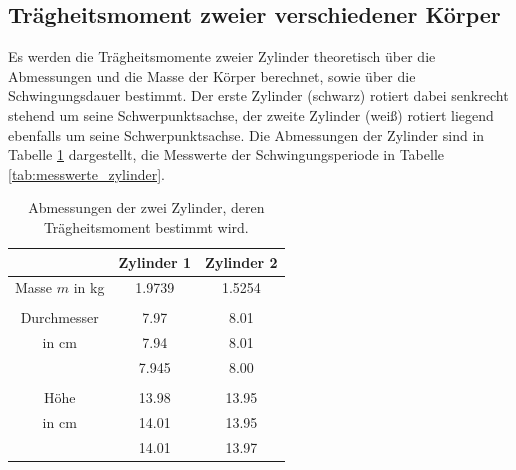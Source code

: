 \subsection{Trägheitsmoment zweier verschiedener Körper}
Es werden die Trägheitsmomente zweier Zylinder theoretisch über die Abmessungen
und die Masse der Körper berechnet, sowie über die Schwingungsdauer bestimmt.
Der erste Zylinder (schwarz) rotiert dabei senkrecht stehend um seine
Schwerpunktsachse, der zweite Zylinder (weiß) rotiert liegend ebenfalls um seine
Schwerpunktsachse.
Die Abmessungen der Zylinder sind in Tabelle \ref{tab:abmessungen_zylinder}
dargestellt, die Messwerte der Schwingungsperiode in Tabelle
\ref{tab:messwerte_zylinder}.
\begin{table}
  \centering
  \begin{tabular}{c| c c}
    \toprule
        & Zylinder 1 & Zylinder 2 \\
    \midrule
    Masse $m$ in \si{\kilo\gram} & 1.9739 & 1.5254 \\
    & & \\
    Durchmesser          & 7.97 & 8.01  \\
    in \si{\centi\meter} & 7.94 & 8.01  \\
                         & 7.945 & 8.00  \\
    & & \\
    Höhe                 & 13.98 & 13.95 \\
    in \si{\centi\meter} & 14.01 & 13.95 \\
                         & 14.01 & 13.97 \\
    \bottomrule
  \end{tabular}
  \caption{Abmessungen der zwei Zylinder, deren Trägheitsmoment bestimmt wird.}
  \label{tab:abmessungen_zylinder}
\end{table}

